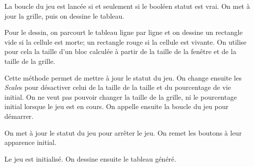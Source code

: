 \documentclass[
	12pt, %
]{fphw}
\begin{document}
\begin{problem}
	
\end{problem}
La boucle du jeu est lancée si et seulement si le booléen statut est vrai. On met à jour la grille, puis on dessine le tableau. 

\begin{problem}
	
\end{problem}
Pour le dessin, on parcourt le tableau ligne par ligne et on dessine un rectangle vide si la cellule est morte; un rectangle rouge si la cellule est vivante. On utilise pour cela la taille d'un bloc calculée à partir de la taille de la fenêtre et de la taille de la grille. 

\begin{problem}
	
\end{problem}
Cette méthode permet de mettre à jour le statut du jeu. On change ensuite les \textit{Scale}s pour désactiver celui de la taille de la taille et du pourcentage de vie initial. On ne veut pas pouvoir changer la taille de la grille, ni le pourcentage initial lorsque le jeu est en cours. 
On appelle ensuite la boucle du jeu pour démarrer.

\begin{problem}
	
\end{problem}
On met à jour le statut du jeu pour arrêter le jeu. On remet les boutons à leur apparence initial. 

\begin{problem}
	
\end{problem}
Le jeu est initialisé. On dessine ensuite le tableau généré.
\end{document}

